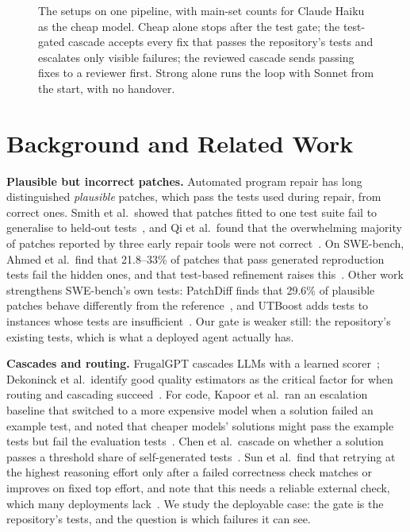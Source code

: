 \documentclass[10pt,conference]{IEEEtran}
\begin{document}
\begin{figure}[t]
\centering

\caption{The setups on one pipeline, with main-set counts for Claude Haiku as the cheap model. Cheap alone stops after
the test gate; the test-gated cascade accepts every fix that passes the repository's tests and escalates only visible
failures; the reviewed cascade sends passing fixes to a reviewer first. Strong alone runs the loop with Sonnet from the start, with no handover.}
\label{fig:pipeline}
\end{figure}

\section{Background and Related Work}
\textbf{Plausible but incorrect patches.} Automated program repair has long distinguished \emph{plausible} patches,
which pass the tests used during repair, from correct ones. Smith et al.\ showed that patches fitted to one test suite
fail to generalise to held-out tests~\cite{smith2015}, and Qi et al.\ found that the overwhelming majority of
patches reported by three early repair tools were not correct~\cite{qi2015}. On SWE-bench, Ahmed et al.\ find that
21.8--33\% of patches that pass generated reproduction tests fail the hidden ones, and that test-based refinement
raises this~\cite{ahmed2025overfitting}. Other work strengthens SWE-bench's own tests: PatchDiff finds that 29.6\% of
plausible patches behave differently from the reference~\cite{wang2025patchdiff}, and UTBoost adds tests to instances
whose tests are insufficient~\cite{utboost}. Our gate is weaker still: the repository's existing tests, which is what a deployed
agent actually has.

\textbf{Cascades and routing.} FrugalGPT cascades LLMs with a learned scorer~\cite{frugalgpt}; Dekoninck et al.\ identify
good quality estimators as the critical factor for when routing and cascading succeed~\cite{dekoninck2025}. For code,
Kapoor et al.\ ran an escalation baseline that switched to a more expensive model when a solution failed an example
test, and noted that cheaper models' solutions might pass the example tests but fail the evaluation
tests~\cite{kapoor2024}. Chen et al.\ cascade on whether a solution passes a threshold share of self-generated
tests~\cite{chen2024cascade}. Sun et al.\ find that retrying at the highest reasoning effort only after a failed
correctness check matches or improves on fixed top effort, and note that this needs a reliable external check, which
many deployments lack~\cite{sun2026effort}. We study the deployable case: the gate
is the repository's tests, and the question is which failures it can see.
\end{document}
